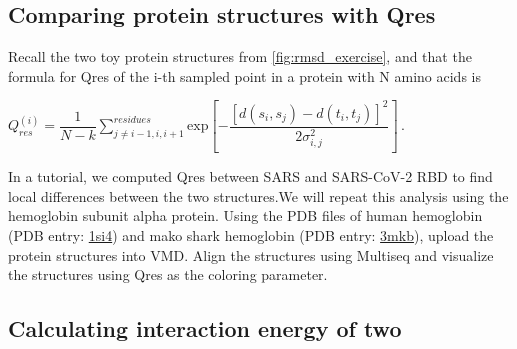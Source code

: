 \begin{exercise}\end{exercise}


\subsection{Comparing protein structures with Qres}

Recall the two toy protein structures from \autoref{fig:rmsd_exercise}, and that the formula for Qres of the i-th sampled point in a protein with N amino acids is

\begin{center}
$Q_{res}^{(i)} = \dfrac{1}{N-k} \sum^{residues}_{j\neq i-1,i,i+1} \textrm{exp}[-\dfrac{[d(s_i,s_j)-d(t_i,t_j)]^2}{2\sigma^2_{i,j}}]\, .$
\end{center}

\begin{exercise}\end{exercise}

In a tutorial, we computed Qres between SARS and SARS-CoV-2 RBD to find local differences between the two structures. We will repeat this analysis using the hemoglobin subunit alpha protein. Using the PDB files of human hemoglobin (PDB entry: \href{https://www.rcsb.org/structure/1si4}{1si4}) and mako shark hemoglobin (PDB entry: \href{https://www.rcsb.org/structure/3mkb}{3mkb}), upload the protein structures into VMD. Align the structures using Multiseq and visualize the structures using Qres as the coloring parameter.\\

\begin{exercise}\end{exercise}

\subsection{Calculating interaction energy of two}

